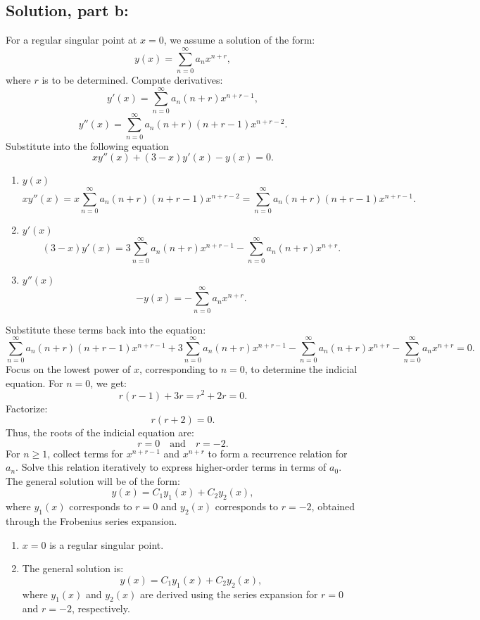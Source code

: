 \documentclass[12pt]{article}
\begin{document}
    \subsection*{Solution, part b:}
        For a regular singular point at \(x = 0\), we assume a solution of the form:
        \[
        y(x) = \sum_{n=0}^\infty a_n x^{n + r},
        \]
        where \(r\) is to be determined.
        Compute derivatives:
        \[
        y'(x) = \sum_{n=0}^\infty a_n (n + r) x^{n + r - 1},
        \]
        \[
        y''(x) = \sum_{n=0}^\infty a_n (n + r)(n + r - 1) x^{n + r - 2}.
        \]
        Substitute into the following equation
        \[
        x y''(x) + (3 - x) y'(x) - y(x) = 0.
        \]
        \begin{enumerate}
            \item \(y(x)\)
                \[
                    x y''(x) = x \sum_{n=0}^\infty a_n (n + r)(n + r - 1) x^{n + r - 2} = \sum_{n=0}^\infty a_n (n + r)(n + r - 1) x^{n + r - 1}.
                \]
            \item \(y'(x)\)
                \[
                    (3 - x) y'(x) = 3 \sum_{n=0}^\infty a_n (n + r) x^{n + r - 1} - \sum_{n=0}^\infty a_n (n + r) x^{n + r}.
                \]
            \item \(y''(x)\)
                \[
                    -y(x) = -\sum_{n=0}^\infty a_n x^{n + r}.
                \]
        \end{enumerate}
        Substitute these terms back into the equation:
        \[
        \sum_{n=0}^\infty a_n (n + r)(n + r - 1) x^{n + r - 1} + 3 \sum_{n=0}^\infty a_n (n + r) x^{n + r - 1} - \sum_{n=0}^\infty a_n (n + r) x^{n + r} - \sum_{n=0}^\infty a_n x^{n + r} = 0.
        \]
        Focus on the lowest power of \(x\), corresponding to \(n = 0\), to determine the indicial equation. For \(n = 0\), we get:
        \[
        r(r - 1) + 3r = r^2 + 2r = 0.
        \]
        Factorize:
        \[
        r(r + 2) = 0.
        \]
        Thus, the roots of the indicial equation are:
        \[
        r = 0 \quad \text{and} \quad r = -2.
        \]
        For \(n \geq 1\), collect terms for \(x^{n + r - 1}\) and \(x^{n + r}\) to form a recurrence relation for \(a_n\). Solve this relation iteratively to express higher-order terms in terms of \(a_0\).
        The general solution will be of the form:
        \[
        y(x) = C_1 y_1(x) + C_2 y_2(x),
        \]
        where \(y_1(x)\) corresponds to \(r = 0\) and \(y_2(x)\) corresponds to \(r = -2\), obtained through the Frobenius series expansion.
        \begin{enumerate}
            \item \(x = 0\) is a regular singular point.
            \item The general solution is:
            \[
            y(x) = C_1 y_1(x) + C_2 y_2(x),
            \]
            where \(y_1(x)\) and \(y_2(x)\) are derived using the series expansion for \(r = 0\) and \(r = -2\), respectively.
        \end{enumerate}
\end{document}
